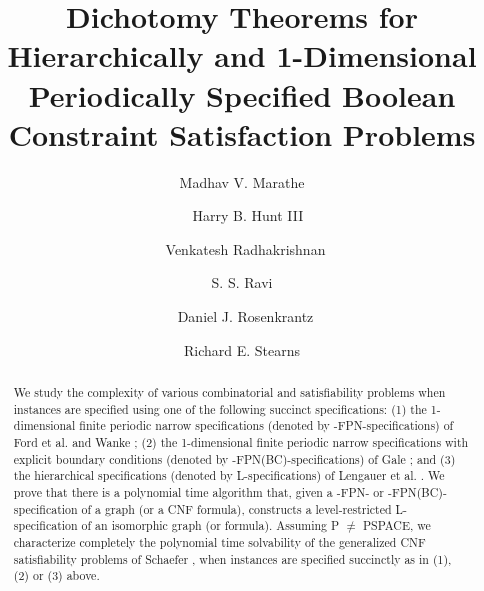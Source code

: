 \documentclass{svproc}
\newcounter{program}
\begin{document}
\title{Dichotomy Theorems for Hierarchically and 1-Dimensional 
Periodically Specified Boolean Constraint Satisfaction Problems}

\author{ Madhav V. Marathe 
       \and{~} Harry B. Hunt III
        \and {~}Venkatesh Radhakrishnan   %
       \and{\newline} S. S. Ravi
       \and  {~}Daniel J. Rosenkrantz
        \and Richard E. Stearns
}


\maketitle



\begin{abstract}
We study the complexity of various combinatorial and satisfiability problems
when instances are specified using one of the following succinct 
specifications:
(1) the 1-dimensional finite periodic narrow specifications 
(denoted by {-FPN}-specifications)  of  
 Ford  et al. and Wanke \cite{FF58,Wa93};
(2) the 1-dimensional finite periodic narrow specifications with explicit
boundary conditions 
(denoted by {-FPN(BC)}-specifications) of Gale \cite{Ga59}; 
and  
(3) the hierarchical specifications (denoted by {\sf L}-specifications)
of Lengauer et al. \cite{LW87a}.
We prove that there is a polynomial time algorithm that,
given a {-FPN}- or {-FPN(BC)}-specification of a graph 
(or a {\sf CNF} formula), constructs a level-restricted {\sf L}-specification
of an isomorphic graph (or formula). Assuming {\sf P} $\neq$
 {\sf PSPACE},  we characterize completely the polynomial time 
solvability of the generalized {\sf CNF} satisfiability problems of 
Schaefer \cite{Sc78}, when instances are specified succinctly
as in (1), (2) or (3) above.
\end{abstract}
\end{document}
